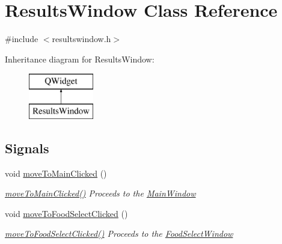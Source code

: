 \hypertarget{class_results_window}{}\section{Results\+Window Class Reference}
\label{class_results_window}


{\ttfamily \#include $<$resultswindow.\+h$>$}

Inheritance diagram for Results\+Window\+:\begin{figure}[H]
\begin{center}
\leavevmode
\includegraphics[height=2.000000cm]{class_results_window}
\end{center}
\end{figure}
\subsection*{Signals}
\begin{DoxyCompactItemize}
\item 
void \mbox{\hyperlink{class_results_window_a55bcbc29f4f178f52fc610a09ec21cb3}{move\+To\+Main\+Clicked}} ()
\begin{DoxyCompactList}\small\item\em \mbox{\hyperlink{class_results_window_a55bcbc29f4f178f52fc610a09ec21cb3}{move\+To\+Main\+Clicked()}} Proceeds to the \mbox{\hyperlink{class_main_window}{Main\+Window}} \end{DoxyCompactList}\item 
void \mbox{\hyperlink{class_results_window_a7a545927d8dd85526646a5d05d758052}{move\+To\+Food\+Select\+Clicked}} ()
\begin{DoxyCompactList}\small\item\em \mbox{\hyperlink{class_results_window_a7a545927d8dd85526646a5d05d758052}{move\+To\+Food\+Select\+Clicked()}} Proceeds to the \mbox{\hyperlink{class_food_select_window}{Food\+Select\+Window}} \end{DoxyCompactList}\end{DoxyCompactItemize}

